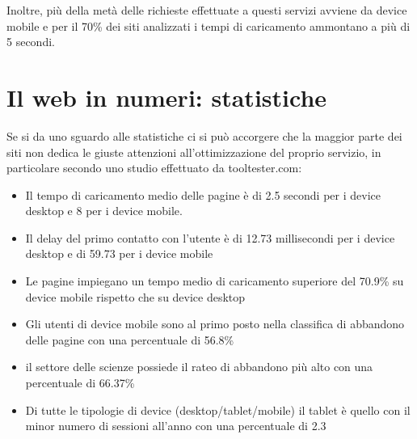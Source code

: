 Inoltre, più della metà delle richieste effettuate a questi servizi avviene da device mobile e per il 70\% dei siti analizzati i tempi di caricamento ammontano a più di 5 secondi. \cite{mobile-page-speed}

\section{Il web in numeri: statistiche}
Se si da uno sguardo alle statistiche ci si può accorgere che la maggior parte dei siti non dedica le giuste attenzioni all'ottimizzazione del proprio servizio, in particolare secondo uno studio effettuato da tooltester.com:
\begin{itemize}
    \item Il tempo di caricamento medio delle pagine è di 2.5 secondi per i device desktop e 8 per i device mobile.
    \item Il delay del primo contatto con l'utente è di 12.73 millisecondi per i device desktop e di 59.73 per i device mobile
    \item Le pagine  impiegano un tempo medio di caricamento superiore del 70.9\% su device mobile rispetto che su device desktop
    \item Gli utenti di device mobile sono al primo posto nella classifica di abbandono delle pagine con una percentuale di 56.8\% 
    \item il settore delle scienze possiede il rateo di abbandono più alto con una percentuale di 66.37\%
    \item Di tutte le tipologie di device (desktop/tablet/mobile) il tablet è quello con il minor numero di sessioni all'anno con una percentuale di 2.3%
\end{itemize}
